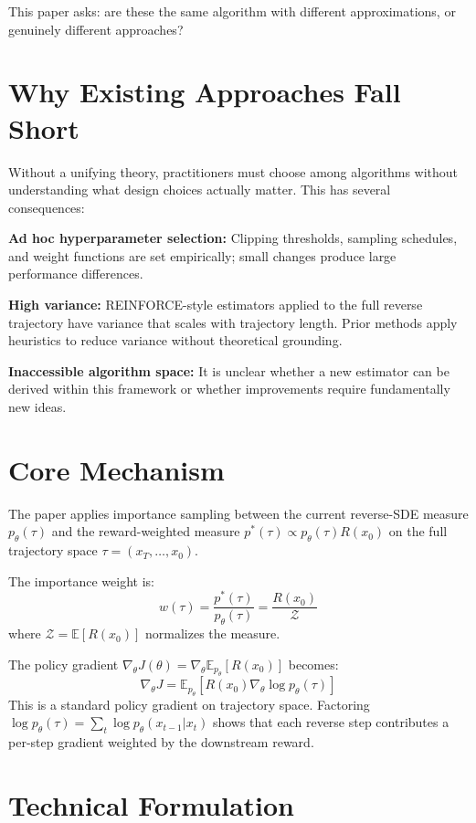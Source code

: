 \documentclass[10pt,twocolumn]{article}
\begin{document}
This paper asks: are these the same algorithm with different
approximations, or genuinely different approaches?

\section{Why Existing Approaches Fall Short}

Without a unifying theory, practitioners must choose among algorithms
without understanding what design choices actually matter. This has
several consequences:

\textbf{Ad hoc hyperparameter selection:} Clipping thresholds, sampling
schedules, and weight functions are set empirically; small changes
produce large performance differences.

\textbf{High variance:} REINFORCE-style estimators applied to the full
reverse trajectory have variance that scales with trajectory length. Prior
methods apply heuristics to reduce variance without theoretical grounding.

\textbf{Inaccessible algorithm space:} It is unclear whether a new
estimator can be derived within this framework or whether improvements
require fundamentally new ideas.

\section{Core Mechanism}

The paper applies importance sampling between the current reverse-SDE
measure $p_\theta(\tau)$ and the reward-weighted measure
$p^*(\tau) \propto p_\theta(\tau) R(x_0)$ on the full trajectory space
$\tau = (x_T, \ldots, x_0)$.

The importance weight is:
\[
  w(\tau) = \frac{p^*(\tau)}{p_\theta(\tau)} = \frac{R(x_0)}{\mathcal{Z}}
\]
where $\mathcal{Z} = \mathbb{E}[R(x_0)]$ normalizes the measure.

The policy gradient $\nabla_\theta J(\theta) = \nabla_\theta
\mathbb{E}_{p_\theta}[R(x_0)]$ becomes:
\[
  \nabla_\theta J = \mathbb{E}_{p_\theta}\!\left[R(x_0)
    \nabla_\theta \log p_\theta(\tau)\right]
\]
This is a standard policy gradient on trajectory space. Factoring
$\log p_\theta(\tau) = \sum_t \log p_\theta(x_{t-1} | x_t)$ shows that
each reverse step contributes a per-step gradient weighted by the
downstream reward.

\section{Technical Formulation}
\end{document}
